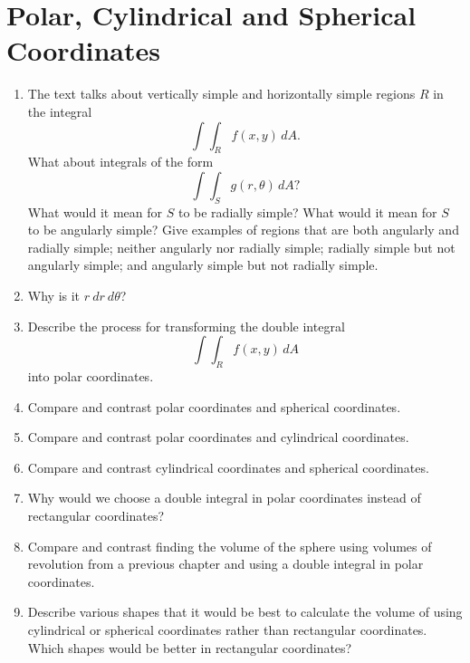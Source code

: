 \section{Polar, Cylindrical and Spherical Coordinates}
\begin{enumerate}    

\item  The text talks about vertically simple and horizontally simple regions $R$ in the integral $$ \int\!\!\!\int_R {f(x,y)\,dA}  .$$  What about integrals of the form $$ \int\!\!\!\int_S {g(r,\theta )\,dA}  ?$$  What would it mean for $S$ to be radially simple?  What would it mean for $S$ to be angularly simple? Give examples of regions that are both angularly and radially simple; neither angularly nor radially simple; radially simple but not angularly simple; and angularly simple but not radially simple.  

\item  Why is it $r\ dr\ d\theta$?  

\item  Describe the process for transforming the double integral $$ \int\!\!\!\int_R {f(x,y)\,dA}  $$  into polar coordinates.  

\item  Compare and contrast polar coordinates and spherical coordinates.  

\item  Compare and contrast polar coordinates and cylindrical coordinates.  

\item  Compare and contrast cylindrical coordinates and spherical coordinates.  

\item  Why would we choose a double integral in polar coordinates instead of rectangular coordinates?  

\item  Compare and contrast finding the volume of the sphere using volumes of revolution from a previous chapter and using a double integral in polar coordinates.  

\item  Describe various shapes that it would be best to calculate the volume of using cylindrical or spherical coordinates rather than rectangular coordinates.  Which shapes would be better in rectangular coordinates?  

 \end{enumerate}   
